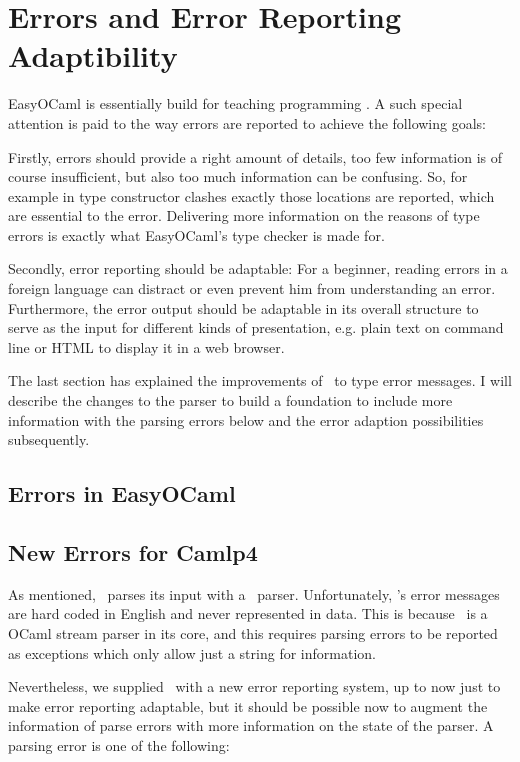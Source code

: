 
\section{Errors and Error Reporting Adaptibility}
\label{sec:errors}

EasyOCaml is essentially build for teaching programming . A such special
attention is paid to the way errors are reported to achieve the following
goals:

Firstly, errors should provide a right amount of details, too few information
is of course insufficient, but also too much information can be confusing. So,
for example in type constructor clashes exactly those locations are reported,
which are essential to the error.  Delivering more information on the reasons
of type errors is exactly what EasyOCaml's type checker is made for.

Secondly, error reporting should be adaptable: For a beginner, reading 
errors in a foreign language can distract or even prevent him from 
understanding an error. Furthermore, the error output should be adaptable in
its overall structure to serve as the input for different kinds of
presentation, e.g. plain text on command line or HTML to display it in a web
browser.

The last section has explained the improvements of \easyocaml\ to type 
error messages. I will describe the changes to the parser to build a foundation
to include more information with the parsing errors below and the error
adaption possibilities subsequently.

\subsection{Errors in EasyOCaml}
\label{sec:easyerrors}


\subsection{New Errors for Camlp4}
\label{hd003001}
As mentioned, \easyocaml\ parses its input with a \camlpf\ parser.  
Unfortunately, \camlpf's error messages are hard coded in English and never
represented in data.  This is because \camlpf\ is a OCaml stream parser in its
core, and this requires parsing errors to be reported as exceptions which only
allow just a string for information.

Nevertheless, we supplied \camlpf\ with a new error reporting system, up 
to now just to make error reporting adaptable, but it should be possible 
now to augment the information of parse errors with more information on the
state of the parser. A parsing error is one of
the following:

